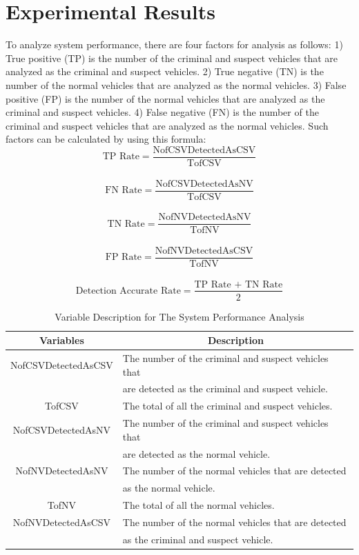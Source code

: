 \section{Experimental Results}
\label{sec:8}
To analyze system performance, there are four factors for analysis as follows:
1) True positive (TP) is the number of the criminal and suspect vehicles that are analyzed as the criminal and suspect vehicles.  
2) True negative (TN) is the number of the normal vehicles that are analyzed as the normal vehicles. 
3) False positive (FP) is the number of the normal vehicles that are analyzed as the criminal and suspect vehicles. 
4) False negative (FN) is the number of the criminal and suspect vehicles that are analyzed as the normal vehicles. 
Such factors can be calculated by using this formula:\\
$$ \text{TP Rate} =  \frac{\text{NofCSVDetectedAsCSV}}{\text{TofCSV}} $$\\
$$ \text{FN Rate} =  \frac{\text{NofCSVDetectedAsNV}}{\text{TofCSV}} $$\\
$$ \text{TN Rate} =  \frac{\text{NofNVDetectedAsNV}}{\text{TofNV}} $$\\ 
$$ \text{FP Rate} =  \frac{\text{NofNVDetectedAsCSV}}{\text{TofNV}} $$\\
$$ \text{Detection Accurate Rate} =  \frac{\text{TP Rate + TN Rate}}{\text{2}} $$

\begin{table}[!t]
\renewcommand{\arraystretch}{1.2}
\caption{Variable Description for The System Performance Analysis}
\label{table_variableSysPerf}
\centering
\begin{tabular}{c|l}
\hline
\bfseries Variables & \multicolumn{1}{c}{\bfseries Description}\\
\hline
NofCSVDetectedAsCSV & The number of the criminal and suspect vehicles that \\ & are detected as the criminal and suspect vehicle.\\
\hline
TofCSV & The total of all the criminal and suspect vehicles.\\
\hline
NofCSVDetectedAsNV & The number of the criminal and suspect vehicles that \\ & are detected as the normal vehicle.\\
\hline
NofNVDetectedAsNV & The number of the normal vehicles that are detected \\ & as the normal vehicle.\\
\hline
TofNV & The total of all the normal vehicles.\\
\hline
NofNVDetectedAsCSV & The number of the normal vehicles that are detected \\ & as the criminal and suspect vehicle.\\
\hline
\end{tabular}
\end{table}

